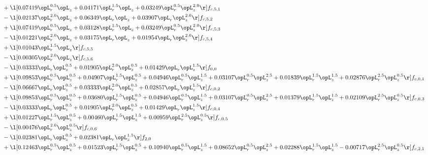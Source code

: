 \begin{alignat}{2}
& + \l[  0.07419 \opL_r^{0.5} \opL_z +  0.04171 \opL_r^{1.5} \opL_z +  0.03249 \opL_r^{0.5} \opL_z^{2.0}  \r] f_{c,5,1} \nonumber \\ 
& - \l[  0.02137 \opL_r^{2.0} \opL_z +  0.06349 \opL_r \opL_z +  0.03907 \opL_r \opL_z^{2.0}  \r] f_{c,5,2} \nonumber \\ 
& + \l[  0.07419 \opL_r^{0.5} \opL_z +  0.03128 \opL_r^{1.5} \opL_z +  0.03249 \opL_r^{0.5} \opL_z^{2.0}  \r] f_{c,5,3} \nonumber \\ 
& - \l[  0.01221 \opL_r^{2.0} \opL_z +  0.03175 \opL_r \opL_z +  0.01954 \opL_r \opL_z^{2.0}  \r] f_{c,5,4} \nonumber \\ 
& + \l[  0.01043 \opL_r^{1.5} \opL_z  \r] f_{c,5,5} \nonumber \\ 
& - \l[  0.00305 \opL_r^{2.0} \opL_z  \r] f_{c,5,6} \nonumber \\ 
& - \l[  0.03333 \opL_r \opL_z^{0.5} +  0.01905 \opL_r^{2.0} \opL_z^{0.5} +  0.01429 \opL_r \opL_z^{1.5}  \r] f_{0,0} \nonumber \\ 
& + \l[  0.09853 \opL_r^{0.5} \opL_z^{0.5} +  0.04907 \opL_r^{1.5} \opL_z^{0.5} +  0.04946 \opL_r^{0.5} \opL_z^{1.5} +  0.03107 \opL_r^{0.5} \opL_z^{2.5} +  0.01839 \opL_r^{1.5} \opL_z^{1.5} +  0.02876 \opL_r^{2.5} \opL_z^{0.5}  \r] f_{c,0,1} \nonumber \\ 
& - \l[  0.06667 \opL_r \opL_z^{0.5} +  0.03333 \opL_r^{2.0} \opL_z^{0.5} +  0.02857 \opL_r \opL_z^{1.5}  \r] f_{c,0,2} \nonumber \\ 
& + \l[  0.09853 \opL_r^{0.5} \opL_z^{0.5} +  0.03680 \opL_r^{1.5} \opL_z^{0.5} +  0.04946 \opL_r^{0.5} \opL_z^{1.5} +  0.03107 \opL_r^{0.5} \opL_z^{2.5} +  0.01379 \opL_r^{1.5} \opL_z^{1.5} +  0.02109 \opL_r^{2.5} \opL_z^{0.5}  \r] f_{c,0,3} \nonumber \\ 
& - \l[  0.03333 \opL_r \opL_z^{0.5} +  0.01905 \opL_r^{2.0} \opL_z^{0.5} +  0.01429 \opL_r \opL_z^{1.5}  \r] f_{c,0,4} \nonumber \\ 
& + \l[  0.01227 \opL_r^{1.5} \opL_z^{0.5} +  0.00460 \opL_r^{1.5} \opL_z^{1.5} +  0.00959 \opL_r^{2.5} \opL_z^{0.5}  \r] f_{c,0,5} \nonumber \\ 
& - \l[  0.00476 \opL_r^{2.0} \opL_z^{0.5}  \r] f_{c,0,6} \nonumber \\ 
& - \l[  0.02381 \opL_r \opL_z^{0.5} +  0.02381 \opL_r \opL_z^{1.5}  \r] f_{2,0} \nonumber \\ 
& + \l[  0.12463 \opL_r^{0.5} \opL_z^{0.5} +  0.01523 \opL_r^{1.5} \opL_z^{0.5} +  0.10940 \opL_r^{0.5} \opL_z^{1.5} +  0.08652 \opL_r^{0.5} \opL_z^{2.5} +  0.02288 \opL_r^{1.5} \opL_z^{1.5}   -0.00717 \opL_r^{2.5} \opL_z^{0.5}  \r] f_{c,2,1} \nonumber \\ 

\end{alignat}
